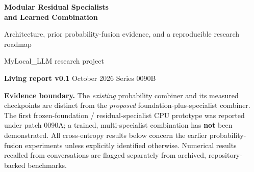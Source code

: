 \documentclass[11pt,letterpaper]{article}
\newcommand{\infobox}[1]{\noindent\colorbox{pale}{\parbox{\dimexpr\linewidth-2\fboxsep\relax}{\small #1}}\par}
\begin{document}
\begin{center}
{\LARGE\bfseries\color{darkblue} Modular Residual Specialists\\[3pt] and Learned Combination}\par\vspace{6pt}
{\large\color{slate} Architecture, prior probability-fusion evidence, and a reproducible research roadmap}\par\vspace{10pt}
{\normalsize MyLocal\_LLM research project}\par\vspace{4pt}
{\small \textbf{Living report v0.1}  October 2026 \quad Series 0090B}
\end{center}
\vspace{7pt}
\infobox{\textbf{Evidence boundary.} The \emph{existing} probability combiner and its measured checkpoints are distinct from the \emph{proposed} foundation-plus-specialist combiner. The first frozen-foundation / residual-specialist CPU prototype was reported under patch 0090A; a trained, multi-specialist combination has \textbf{not} been demonstrated. All cross-entropy results below concern the earlier probability-fusion experiments unless explicitly identified otherwise. Numerical results recalled from conversations are flagged separately from archived, repository-backed benchmarks.}
\begin{abstract}
The research objective is to expand a single, frozen general-language foundation with several independently trained Transformer specialists whose outputs correct its contextual predictions. A specialist need not be a small adapter: the nominal long-run target is a 12-layer, width-1024, FFN-4096 Transformer (approximately 182 million dense-block parameters), while the two-layer implementation is only a correctness probe. Each specialist may have a different causal historical-memory reader, including a longer retrievable horizon than the foundation. This note defines the mathematical interface between the foundation, specialists, and combiners; compares probability averaging, residual-logit fusion, and residual-hidden-state fusion; documents the earlier 0082-series combination results and 2026-10-25 performance measurements; and establishes controls, acceptance criteria, and a versioned evidence ledger for future experiments. The aim is to test \emph{whether domain-specific capacity can be added more efficiently and composably than retraining entire models}, not to presume that combining networks automatically yields a stronger language model.
\end{abstract}
\tableofcontents
\clearpage
\end{document}
